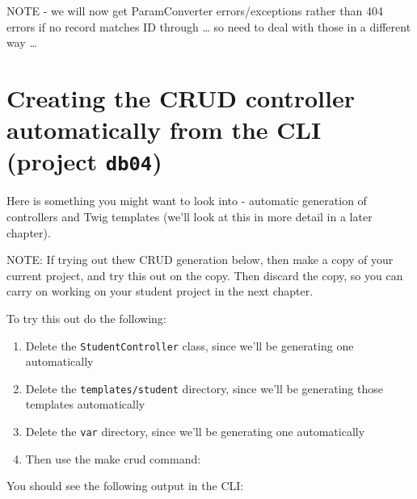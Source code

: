 \documentclass[a4paperpaper,openright]{book}
\newenvironment{Shaded}{}{}
\newcommand{\ExtensionTok}[1]{#1}
\newcommand{\NormalTok}[1]{#1}
\begin{document}
NOTE - we will now get ParamConverter errors/exceptions rather than 404
errors if no record matches ID through \ldots{} so need to deal with
those in a different way \ldots{}

\hypertarget{creating-the-crud-controller-automatically-from-the-cli-project-db04}{%
\section{\texorpdfstring{Creating the CRUD controller automatically from
the CLI (project
\texttt{db04})}{Creating the CRUD controller automatically from the CLI (project db04)}}\label{creating-the-crud-controller-automatically-from-the-cli-project-db04}}

Here is something you might want to look into - automatic generation of
controllers and Twig templates (we'll look at this in more detail in a
later chapter).

NOTE: If trying out thew CRUD generation below, then make a copy of your
current project, and try this out on the copy. Then discard the copy, so
you can carry on working on your student project in the next chapter.

To try this out do the following:

\begin{enumerate}
\def\labelenumi{\arabic{enumi}.}
\item
  Delete the \texttt{StudentController} class, since we'll be generating
  one automatically
\item
  Delete the \texttt{templates/student} directory, since we'll be
  generating those templates automatically
\item
  Delete the \texttt{var} directory, since we'll be generating one
  automatically
\item
  Then use the make crud command:

\begin{Shaded}
\end{Shaded}
\end{enumerate}

You should see the following output in the CLI:
\end{document}
